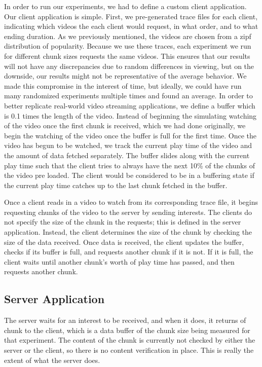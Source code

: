 In order to run our experiments, we had to define a custom client application.
Our client application is simple. First, we pre-generated trace files for each
client, indicating which videos the each client would request, in what order,
and to what ending duration. As we previously mentioned, the videos are chosen
from a zipf distribution of popularity. Because we use these traces, each
experiment we run for different chunk sizes requests the same videos. This
ensures that our results will not have any discrepancies due to random
differences in viewing, but on the downside, our results might not be
representative of the average behavior. We made this compromise in the interest
of time, but ideally, we could have run many randomized experiments multiple
times and found an average.
In order to better replicate real-world video streaming applications, we define
a buffer which is 0.1 times the length of the video. Instead of beginning the
simulating watching of the video once the first chunk is received, which we had
done originally, we begin the watching of the video once the buffer is full for
the first time. Once the video has begun to be watched, we track the current
play time of the video and the amount of data fetched separately. The buffer
slides along with the current play time such that the client tries to always
have the next 10\% of the chunks of the video pre loaded. The client would be
considered to be in a buffering state if the current play time catches up to the
last chunk fetched in the buffer.

Once a client reads in a video to watch from its corresponding trace file, it
begins requesting chunks of the video to the server by sending interests. The
clients do not specify the size of the chunk in the requests; this is defined in
the server application. Instead, the client determines the size of the chunk by
checking the size of the data received. Once data is received, the client
updates the buffer, checks if its buffer is full, and requests another chunk if
it is not. If it is full, the client waits until another chunk's worth of play
time has passed, and then requests another chunk.

\subsection{Server Application} \label{sec:server}

The server waits for an interest to be received, and when it does, it returns of
chunk to the client, which is a data buffer of the chunk size being measured for
that experiment. The content of the chunk is currently not checked by either the
server or the client, so there is no content verification in place. This is
really the extent of what the server does.

